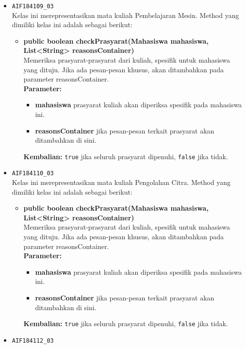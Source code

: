 \begin{enumerate}
\begin{itemize}
\begin{itemize}
		\end{itemize}
		\item \texttt{AIF184109\_03} \\
		Kelas ini merepresentasikan mata kuliah Pembelajaran Mesin. Method yang dimiliki kelas ini adalah sebagai berikut: 
		\begin{itemize}
			\item \textbf{public boolean checkPrasyarat(Mahasiswa mahasiswa, List<String> reasonsContainer)}\\
			Memeriksa prasyarat-prasyarat dari kuliah, spesifik untuk mahasiswa yang dituju. Jika ada pesan-pesan khusus, akan ditambahkan pada parameter reasonsContainer.\\
			\textbf{Parameter:}
			\begin{itemize}
				\item \textbf{mahasiswa} prasyarat kuliah akan diperiksa spesifik pada mahasiswa ini.
				\item \textbf{reasonsContainer} jika pesan-pesan terkait prasyarat akan ditambahkan di sini.
			\end{itemize}
			\textbf{Kembalian:} \texttt{true} jika seluruh prasyarat dipenuhi, \texttt{false} jika tidak.
		\end{itemize}
		\item \texttt{AIF184110\_03} \\
		Kelas ini merepresentasikan mata kuliah Pengolahan Citra. Method yang dimiliki kelas ini adalah sebagai berikut: 
		\begin{itemize}
			\item \textbf{public boolean checkPrasyarat(Mahasiswa mahasiswa, List<String> reasonsContainer)}\\
			Memeriksa prasyarat-prasyarat dari kuliah, spesifik untuk mahasiswa yang dituju. Jika ada pesan-pesan khusus, akan ditambahkan pada parameter reasonsContainer.\\
			\textbf{Parameter:}
			\begin{itemize}
				\item \textbf{mahasiswa} prasyarat kuliah akan diperiksa spesifik pada mahasiswa ini.
				\item \textbf{reasonsContainer} jika pesan-pesan terkait prasyarat akan ditambahkan di sini.
			\end{itemize}
			\textbf{Kembalian:} \texttt{true} jika seluruh prasyarat dipenuhi, \texttt{false} jika tidak.
		\end{itemize}
		\item \texttt{AIF184112\_03} \\

\end{itemize}
\end{enumerate}
